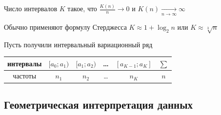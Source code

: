 \begin{enumerate}
    Число интервалов $K$ такое, что $\frac{K(n)}{n} \longrightarrow 0$ и $K(n) \underset{n \to \infty}{\longrightarrow} \infty$

    Обычно применяют формулу Стерджесса $K \approx 1 + \log_2 n$ или $K \approx \sqrt[3]{n}$

    Пусть получили интервальный вариационный ряд

    \begin{tabular}{c|c|c|c|c|c}
        интервалы & $[a_0; a_1)$ & $[a_1; a_2)$ & \dots & $[a_{K - 1}; a_K]$ & $\sum$ \\ 
        \hline
        частоты & $n_1$ & $n_2$ & \dots & $n_K$ & $n$ \\ 
    \end{tabular}

\end{enumerate}

\subsection{Геометрическая интерпретация данных}


